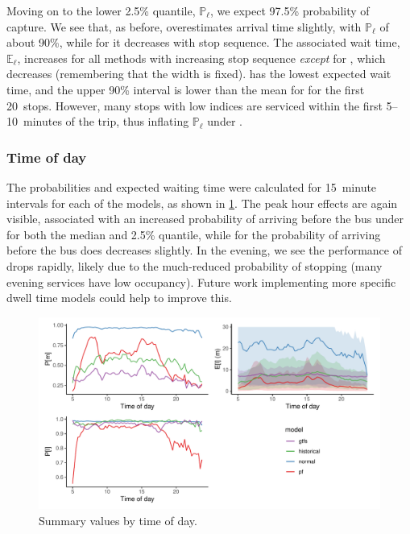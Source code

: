 Moving on to the lower 2.5\% quantile, $\mathbb{P}_\ell$, we expect 97.5\% probability of capture. We see that, as before, \Fpf{} overestimates arrival time slightly, with $\mathbb{P}_\ell$ of about 90\%, while for \Fsched{} it decreases with stop sequence. The associated wait time, $\mathbb{E}_\ell$, increases for all methods with increasing stop sequence \emph{except} for \Fsched{}, which decreases (remembering that the width is fixed). \Fpf{} has the lowest expected wait time, and the upper 90\% interval is lower than the mean for \Fsched{} for the first 20~stops. However, many stops with low indices are serviced within the first 5--10~minutes of the trip, thus inflating $\mathbb{P}_\ell$ under \Fsched{}.


\subsubsection{Time of day}

The probabilities and expected waiting time were calculated for 15~minute intervals for each of the models, as shown in \cref{fig:model_results_pr_timeofday}. The peak hour effects are again visible, associated with an increased probability of arriving before the bus under \Fpf{} for both the median and 2.5\% quantile, while for \Fsched{} the probability of arriving before the bus does decreases slightly. In the evening, we see the performance of \Fpf{} drops rapidly, likely due to the much-reduced probability of stopping (many evening services have low occupancy). Future work implementing more specific dwell time models could help to improve this.


\begin{knitrout}\small
{}\color{fgcolor}\begin{figure}
\includegraphics[width=\textwidth]{figure/model_results_pr_timeofday-1} \caption[Summary values by time of day]{Summary values by time of day.}\label{fig:model_results_pr_timeofday}
\end{figure}


\end{knitrout}


